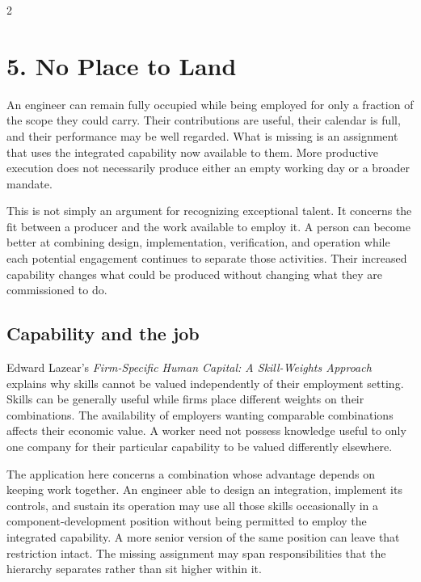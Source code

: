 \clearpage
\begin{multicols}{2}

\section{5. No Place to Land}\label{no-place-to-land-1}

An engineer can remain fully occupied while being employed for only a
fraction of the scope they could carry. Their contributions are useful,
their calendar is full, and their performance may be well regarded. What
is missing is an assignment that uses the integrated capability now
available to them. More productive execution does not necessarily
produce either an empty working day or a broader mandate.

This is not simply an argument for recognizing exceptional talent. It
concerns the fit between a producer and the work available to employ it.
A person can become better at combining design, implementation,
verification, and operation while each potential engagement continues to
separate those activities. Their increased capability changes what could
be produced without changing what they are commissioned to do.

\subsection{Capability and the job}\label{capability-and-the-job}

Edward Lazear's \emph{Firm-Specific Human Capital: A Skill-Weights
Approach} \citep{lazear2009skills} explains why skills cannot be valued
independently of their employment setting. Skills can be generally
useful while firms place different weights on their combinations. The
availability of employers wanting comparable combinations affects their
economic value. A worker need not possess knowledge useful to only one
company for their particular capability to be valued differently
elsewhere.

The application here concerns a combination whose advantage depends on
keeping work together. An engineer able to design an integration,
implement its controls, and sustain its operation may use all those
skills occasionally in a component-development position without being
permitted to employ the integrated capability. A more senior version of
the same position can leave that restriction intact. The missing
assignment may span responsibilities that the hierarchy separates rather
than sit higher within it.


\end{multicols}
